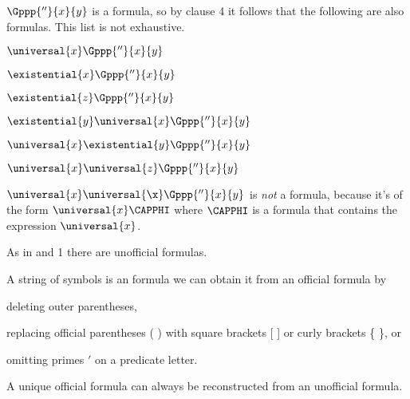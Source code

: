 $\Gppp{''}{\variable{x}}{\variable{y}}$ is a formula, so by clause 4 it follows that the following are also formulas.
This list is not exhaustive.
\begin{multicols}{2}
\begin{menumerate}
\item $\universal{\variable{x}}\Gppp{''}{\variable{x}}{\variable{y}}$ 
\item $\existential{\variable{x}}\Gppp{''}{\variable{x}}{\variable{y}}$ 
\item $\existential{\variable{z}}\Gppp{''}{\variable{x}}{\variable{y}}$
\item $\existential{\variable{y}}\universal{\variable{x}}\Gppp{''}{\variable{x}}{\variable{y}}$ 
\item $\universal{\variable{x}}\existential{\variable{y}}\Gppp{''}{\variable{x}}{\variable{y}}$ 
\item $\universal{\variable{x}}\universal{\variable{z}}\Gppp{''}{\variable{x}}{\variable{y}}$ 
\end{menumerate}
\end{multicols}
\noindent{}$\universal{\variable{x}}\universal{\x}\Gppp{''}{\variable{x}}{\variable{y}}$ is \emph{not} a formula, because it's of the form $\universal{\variable{x}}\CAPPHI$ where $\CAPPHI$ is a formula that contains the expression $\universal{\variable{x}}$.

As in \GSL{} and \GQL{}1 there are unofficial formulas.
\begin{majorILnc}{}
A string of symbols is an  formula \Iff we can obtain it from an official formula by
\begin{cenumerate}
\item deleting outer parentheses,
\item replacing official parentheses ( ) with square brackets [ ] or curly brackets \{ \}, or
\item omitting primes $'$ on a predicate letter.
\end{cenumerate}
\end{majorILnc}

\noindent{}A unique official formula can always be reconstructed from an unofficial formula.

